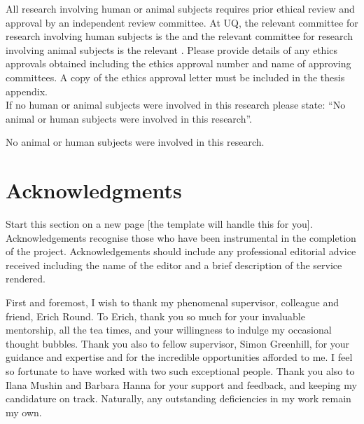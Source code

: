 \begin{instructional}
	All research involving human or animal subjects requires prior ethical review and approval by an independent review committee. At UQ, the relevant committee for research involving human subjects is the \href{http://www.uq.edu.au/research/integrity-compliance/human-ethics}{\color{blue}{Human Ethics Unit}} and the relevant committee for research involving animal subjects is the relevant \href{http://www.uq.edu.au/research/integrity-compliance/animal-welfare}{\color{blue}{Animal Ethics Committee}}.  Please provide details of any ethics approvals obtained including the ethics approval number and name of approving committees.  A copy of the ethics approval letter must be included in the thesis appendix.\\
    
    \noindent
	If no human or animal subjects were involved in this research please state: ``No animal or human subjects were involved in this research''.
\end{instructional}


No animal or human subjects were involved in this research.



\clearpage
\section*{Acknowledgments}

\begin{instructional}
    Start this section on a new page [the template will handle this for you].\\
    
    \noindent
    Acknowledgements recognise those who have been instrumental in the completion of the project.  Acknowledgements should include any professional editorial advice received including the name of the editor and a brief description of the service rendered.
\end{instructional}

First and foremost, I wish to thank my phenomenal supervisor, colleague and friend, Erich Round. To Erich, thank you so much for your invaluable mentorship, all the tea times, and your willingness to indulge my occasional thought bubbles. Thank you also to fellow supervisor, Simon Greenhill, for your guidance and expertise and for the incredible opportunities afforded to me. I feel so fortunate to have worked with two such exceptional people. Thank you also to Ilana Mushin and Barbara Hanna for your support and feedback, and keeping my candidature on track. Naturally, any outstanding deficiencies in my work remain my own.

